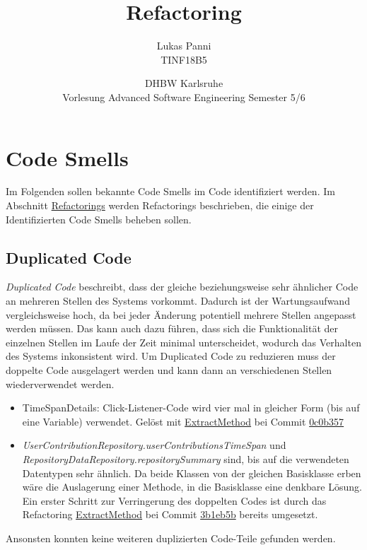 \documentclass[12pt]{article}
\title{Refactoring}
\date{DHBW Karlsruhe\\ Vorlesung Advanced Software Engineering Semester 5/6}
\author{Lukas Panni \\ TINF18B5}
\begin{document}
\maketitle

\newpage

\tableofcontents

\newpage

\section{Code Smells} 

Im Folgenden sollen bekannte Code Smells im Code identifiziert werden. Im Abschnitt \hyperref[sec:Refactorings]{Refactorings} werden Refactorings beschrieben, die einige der Identifizierten Code Smells beheben sollen.


\subsection{Duplicated Code}

\textit{Duplicated Code} beschreibt, dass der gleiche beziehungsweise sehr ähnlicher Code an mehreren Stellen des Systems vorkommt.
Dadurch ist der Wartungsaufwand vergleichsweise hoch, da bei jeder Änderung potentiell mehrere Stellen angepasst werden müssen. Das kann auch dazu führen, dass sich die Funktionalität der einzelnen Stellen im Laufe der Zeit minimal unterscheidet, wodurch das Verhalten des Systems inkonsistent wird.
Um Duplicated Code zu reduzieren muss der doppelte Code ausgelagert werden und kann dann an verschiedenen Stellen wiederverwendet werden.

\begin{itemize}
	\item{TimeSpanDetails: Click-Listener-Code wird vier mal in gleicher Form (bis auf eine Variable) verwendet. Gelöst mit {\hyperref[sec:ExtractMethod_TimeSpanDetails]{ExtractMethod}} bei Commit \href{https://github.com/lukaspanni/OpenSourceStats/commit/0c0b357dee742575d8465ae26e64152bfecbf5ab} {0c0b357}}
	
	\item{\textit{UserContributionRepository.userContributionsTimeSpan} und \textit{RepositoryDataRepository.repositorySummary} sind, bis auf die verwendeten Datentypen sehr ähnlich. 
Da beide Klassen von der gleichen Basisklasse erben wäre die Auslagerung einer Methode, in die Basisklasse eine denkbare Lösung.
\newline
Ein erster Schritt zur Verringerung des doppelten Codes ist durch das Refactoring {\hyperref[sec:ExtractMethod_Repository]{ExtractMethod}} bei Commit \href{https://github.com/lukaspanni/OpenSourceStats/commit/3b1eb5bf6750c3ccaeb05962ec8a8ae743adbf2c} {3b1eb5b} bereits umgesetzt.} 		
\end{itemize}
Ansonsten konnten keine weiteren duplizierten Code-Teile gefunden werden.
\end{document}
